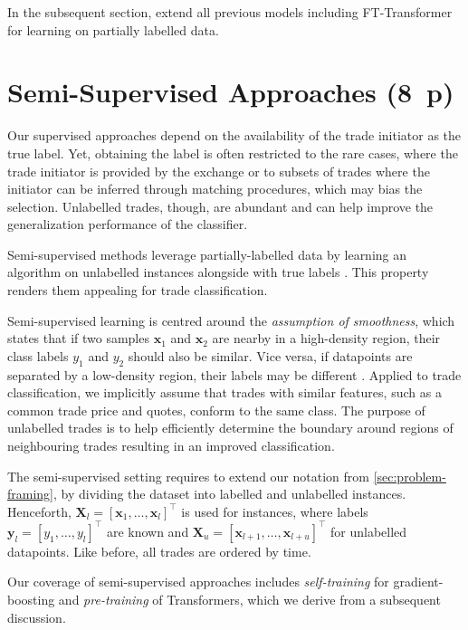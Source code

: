 In the subsequent section, extend all previous models including FT-Transformer for learning on partially labelled data.

\newpage
\section{Semi-Supervised Approaches (8~p)}\label{sec:semi-supervised-approaches}

Our supervised approaches depend on the availability of the trade initiator as the true label. Yet, obtaining the label is often restricted to the rare cases, where the trade initiator is provided by the exchange or to subsets of trades where the initiator can be inferred through matching procedures, which may bias the selection. Unlabelled trades, though, are abundant and can help improve the generalization performance of the classifier. 

Semi-supervised methods leverage partially-labelled data by learning an algorithm on unlabelled instances alongside with true labels \autocite[][6]{chapelleSemisupervisedLearning2006}. This property renders them appealing for trade classification.

Semi-supervised learning is centred around the \textit{assumption of smoothness}, which states that if two samples $\mathbf{x}_{1}$ and $\mathbf{x}_{2}$ are nearby in a high-density region, their class labels $y_{1}$ and $y_{2}$ should also be similar. Vice versa, if datapoints are separated by a low-density region, their labels may be different \autocite[][5]{chapelleSemisupervisedLearning2006}. Applied to trade classification, we implicitly assume that trades with similar features, such as a common trade price and quotes, conform to the same class. The purpose of unlabelled trades is to help efficiently determine the boundary around regions of neighbouring trades resulting in an improved classification.

The semi-supervised setting requires to extend our notation from \cref{sec:problem-framing}, by dividing the dataset into labelled and unlabelled instances. Henceforth, $\mathbf{X}_{l} = \left[\mathbf{x}_{1},\ldots, \mathbf{x}_{l}\right]^{\top}$ is used for instances, where labels $\mathbf{y}_{l} = \left[y_{1},\ldots, y_{l}\right]^{\top}$ are known and $\mathbf{X}_{u} = \left[\mathbf{x}_{l+1},\ldots, \mathbf{x}_{l+u}\right]^{\top}$ for unlabelled datapoints. Like before, all trades are ordered by time.

Our coverage of semi-supervised approaches includes \emph{self-training} for gradient-boosting and \emph{pre-training} of Transformers, which we derive from a subsequent discussion.

